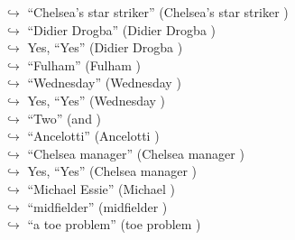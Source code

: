 \documentclass[11pt,a4paper, onecolumn]{article}
\begin{document}
\begin{figure}[t] \small \begin{tcolorbox}[boxsep=0pt,left=5pt,right=0pt,top=2pt,colback = yellow!5] \begin{dialogue}
 \small 
\colorbox{pink!25}{$\hookrightarrow$}
{ ``Chelsea's star striker'' (Chelsea's star striker ) }
\\
\colorbox{pink!25}{$\hookrightarrow$}
{ ``Didier Drogba'' (Didier Drogba ) }
\\
\colorbox{pink!25}{$\hookrightarrow$}
\colorbox{red!25}{Yes,}
{ ``Yes'' (Didier Drogba ) }
\\
\colorbox{pink!25}{$\hookrightarrow$}
{ ``Fulham'' (Fulham ) }
\\
\colorbox{pink!25}{$\hookrightarrow$}
{ ``Wednesday'' (Wednesday ) }
\\
\colorbox{pink!25}{$\hookrightarrow$}
\colorbox{red!25}{Yes,}
{ ``Yes'' (Wednesday ) }
\\
\colorbox{pink!25}{$\hookrightarrow$}
{ ``Two'' (and ) }
\\
\colorbox{pink!25}{$\hookrightarrow$}
{ ``Ancelotti'' (Ancelotti ) }
\\
\colorbox{pink!25}{$\hookrightarrow$}
{ ``Chelsea manager'' (Chelsea manager ) }
\\
\colorbox{pink!25}{$\hookrightarrow$}
\colorbox{red!25}{Yes,}
{ ``Yes'' (Chelsea manager ) }
\\
\colorbox{pink!25}{$\hookrightarrow$}
{ ``Michael Essie'' (Michael ) }
\\
\colorbox{pink!25}{$\hookrightarrow$}
{ ``midfielder'' (midfielder ) }
\\
\colorbox{pink!25}{$\hookrightarrow$}
{ ``a toe problem'' (toe problem ) }
\\

\end{dialogue}
\end{tcolorbox}
\end{figure}
\end{document}
